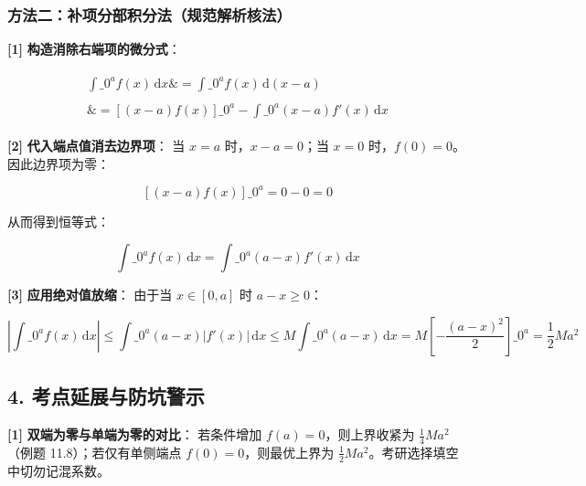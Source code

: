 \documentclass[11pt,a4paper,UTF8]{ctexart}
\begin{document}
\subsubsection{方法二：补项分部积分法（规范解析核法）}
\begin{solbox}[分步推导与答题规范]
\textbf{[1]}  \textbf{构造消除右端项的微分式}：

\begin{align*}
\begin{aligned}
\int\_0^a f(x)\,\mathrm{d}x \&= \int\_0^a f(x)\,\mathrm{d}(x - a) \\ \\
\&= \left[ (x - a)f(x) \right]\_0^a - \int\_0^a (x - a)f'(x)\,\mathrm{d}x
\end{aligned}
\end{align*}


\textbf{[2]}  \textbf{代入端点值消去边界项}：
当 $x = a$ 时，$x - a = 0$；当 $x = 0$ 时，$f(0) = 0$。因此边界项为零：

\begin{equation*}
\left[ (x - a)f(x) \right]\_0^a = 0 - 0 = 0
\end{equation*}

从而得到恒等式：

\begin{equation*}
\int\_0^a f(x)\,\mathrm{d}x = \int\_0^a (a - x)f'(x)\,\mathrm{d}x
\end{equation*}


\textbf{[3]}  \textbf{应用绝对值放缩}：
由于当 $x \in [0, a]$ 时 $a - x \ge 0$：

\begin{equation*}
\left| \int\_0^a f(x)\,\mathrm{d}x \right| \le \int\_0^a (a - x)|f'(x)|\,\mathrm{d}x \le M \int\_0^a (a - x)\,\mathrm{d}x = M \left[ -\frac{(a-x)^2}{2} \right]\_0^a = \frac{1}{2} M a^2
\end{equation*}

\end{solbox}


\subsection{4. 考点延展与防坑警示}
\begin{solbox}[分步推导与答题规范]
\textbf{[1]}  \textbf{双端为零与单端为零的对比}：
若条件增加 $f(a) = 0$，则上界收紧为 $\frac{1}{4}Ma^2$（例题 11.8）；若仅有单侧端点 $f(0) = 0$，则最优上界为 $\frac{1}{2}Ma^2$。考研选择填空中切勿记混系数。
\end{solbox}
\end{document}
